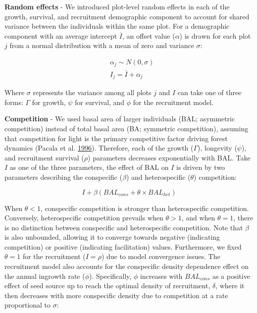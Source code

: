 \documentclass[12pt]{article}
\begin{document}
\textbf{Random effects} - We introduced plot-level random effects in
each of the growth, survival, and recruitment demographic component to
account for shared variance between the individuals within the same
plot. For a demographic component with an average intercept
\(\overline{I}\), an offset value (\(\alpha\)) is drawn for each plot
\(j\) from a normal distribution with a mean of zero and variance
\(\sigma\):

\begin{equation}
\begin{split}
&\alpha_{j} \sim N(0, \sigma) \\[2pt]
&I_j = \overline{I} + \alpha_j
\end{split}
\label{eq:randomEffect}\end{equation}

Where \(\sigma\) represents the variance among all plots \(j\) and \(I\)
can take one of three forms: \(\Gamma\) for growth, \(\psi\) for
survival, and \(\phi\) for the recruitment model.

\textbf{Competition} - We used basal area of larger individuals (BAL;
asymmetric competition) instead of total basal area (BA; symmetric
competition), assuming that competition for light is the primary
competitive factor driving forest dynamics (Pacala et al.
\protect\hyperlink{ref-Pacala1996a}{1996}). Therefore, each of the
growth (\(\Gamma\)), longevity (\(\psi\)), and recruitment survival
(\(\rho\)) parameters decreases exponentially with BAL. Take \(I\) as
one of the three parameters, the effect of BAL on \(I\) is driven by two
parameters describing the conspecific (\(\beta\)) and heterospecific
(\(\theta\)) competition:

\begin{equation}
  I + \beta (BAL_{cons} + \theta \times BAL_{het})
\label{eq:compEffect}\end{equation}

When \(\theta < 1\), conspecific competition is stronger than
heterospecific competition. Conversely, heterospecific competition
prevails when \(\theta > 1\), and when \(\theta = 1\), there is no
distinction between conspecific and heterospecific competition. Note
that \(\beta\) is also unbounded, allowing it to converge towards
negative (indicating competition) or positive (indicating facilitation)
values. Furthermore, we fixed \(\theta = 1\) for the recruitment
(\(I = \rho\)) due to model convergence issues. The recruitment model
also accounts for the conspecific density dependence effect on the
annual ingrowth rate (\(\phi\)). Specifically, \(\phi\) increases with
\(BAL_{cons}\) as a positive effect of seed source up to reach the
optimal density of recruitment, \(\delta\), where it then decreases with
more conspecific density due to competition at a rate proportional to
\(\sigma\):
\end{document}
